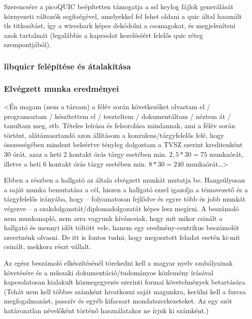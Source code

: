 \documentclass[a4paper,oneside]{article}
\begin{document}
Szerencsére a picoQUIC beépítetten támogatja a ssl keylog fájlok generálását környezeti változók 
segítségével, amelyekkel fel lehet oldani a quic által használt tls titkosítást,
így a wireshark képes dekódolni a csomagokat, és megjeleníteni azok 
tartalmát (legalábbis a kapcsolat kezeléséért felelős quic réteg szempontjából).


\subsubsection{libquicr felépítése és átalakítása}
\paragraph{}




\subsubsection{Elvégzett munka eredményei}


<Én magam (nem a társam) a félév során következőket olvastam el /
programoztam / készítettem el / teszteltem / dokumentáltam / néztem át
/ tanultam meg, stb.  Tételes leírása és felsorolása mindannak, ami a
félév során történt, alátámasztandó azon állításom a
konzulens/tárgyfelelős felé, hogy összességében mindent beleértve
tényleg dolgoztam a TVSZ szerint kreditenként 30 órát, azaz a heti 2
kontakt órás tárgy esetében min. $2,5*30 = 75$ munkaórát, illetve a
heti 6 kontakt órás tárgy esetében min. $8*30 = 240$ munkaórát\dots>

Ebben a részben a hallgató az általa elvégzett munkát mutatja
be. Hangsúlyosan a saját munka bemutatása a cél, hiszen a hallgató
ezzel igazolja a témavezető és a tárgyfelelős irányába, hogy --
folyamatosan fejlődve és egyre több és jobb munkát végezve -- a
szakdolgozatát/diplomadolgozatát képes lesz megírni.  A beszámoló nem
munkanapló, nem arra vagyunk kíváncsiak, hogy mit mikor csinált a
hallgató és mennyi időt töltött vele, hanem egy eredmény-centrikus
beszámolót szeretnénk olvasni.  De itt is fontos tudni, hogy
megosztott feladat esetén ki-mit csinált, mekkora részt vállalt.

Az egész beszámoló elkészítésénél törekedni kell a magyar nyelv
szabályainak követésére és a műszaki dokumentáció/tudományos közlemény
írásával kapcsolatosan kialakult közmegegyezés szerinti formai
követelmények betartására.  (Tehát nem kell többes számként hivatkozni
saját magunkra, kerülni kell a furcsa megfogalmazást, passzív és egyéb
kifacsart mondatszerkezeteket.  Az egy szót határozatlan névelőként
történő használatakor ne írjuk ki számként.)
\end{document}
